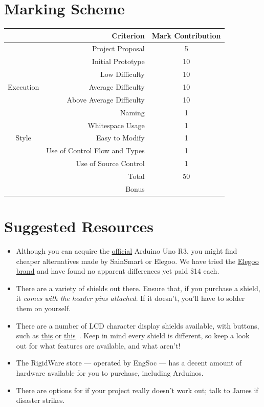 \documentclass{article}
\begin{document}
\section*{Marking Scheme}
\begin{center}
\begin{tabular}[c]{cr|c}
& \textbf{Criterion} & \textbf{Mark Contribution} \\ \hline

& Project Proposal & 5 \\ \hline

& Initial Prototype & 10 \\ \hline

\multirow{3}{*}{Execution}
    & Low Difficulty &  10 \\
    & Average Difficulty & 10 \\
    & Above Average Difficulty & 10 \\ \hline

\multirow{5}{*}{Style}
    & Naming &  1 \\
    & Whitespace Usage & 1\\
    & Easy to Modify & 1\\
    & Use of Control Flow and Types & 1\\
    & Use of Source Control & 1\\ \hhline{==|=}

& Total & 50 \\ \hhline{==|=}
& Bonus &
\end{tabular}
\end{center}

\section*{Suggested Resources}
\begin{itemize}
    \item Although you can acquire the \href{https://store.arduino.cc/usa/arduino-uno-rev3}{official} Arduino Uno R3, you might find cheaper alternatives made by SainSmart or Elegoo.  We have tried the \href{https://www.amazon.ca/gp/product/B01EWOE0UU/}{Elegoo brand} and have found no apparent differences yet paid \$14 each.
    \item There are a variety of shields out there.  Ensure that, if you purchase a shield, it \emph{comes with the header pins attached}.  If it doesn't, you'll have to solder them on yourself.
    \item There are a number of LCD character display shields available, with buttons, such as \href{https://www.amazon.ca/gp/product/B01C9V7U8W/}{this} or \href{http://www.robotshop.com/ca/en/lcd12864-lcd-shield-arduino-compatible.html}{this}~.  Keep in mind every shield is different, so keep a look out for what features are available, and what aren't!
    \item The RigidWare store --- operated by EngSoc --- has a decent amount of hardware available for you to purchase, including Arduinos.
    \item There are options for if your project really doesn't work out; talk to James if disaster strikes.
\end{itemize}
\end{document}
